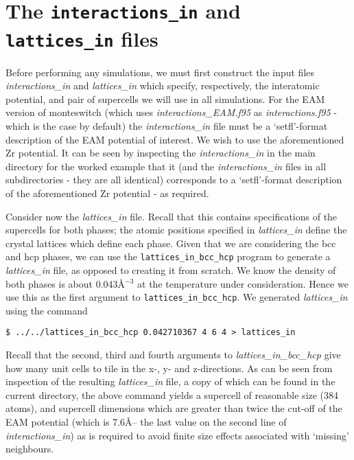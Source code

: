 \documentclass{report}
\begin{document}
\section{The \texttt{interactions\_in} and \texttt{lattices\_in} files}
Before performing any simulations, we must first construct the input files \emph{interactions\_in} and \emph{lattices\_in}
which specify, respectively, the interatomic potential, and pair of supercells we will use in all simulations. 
For the EAM version of monteswitch (which uses \emph{interactions\_EAM.f95} as \emph{interactions.f95} - which is the case by
default) the \emph{interactions\_in} file must be a `setfl'-format description of the EAM potential of interest.
We wish to use the aforementioned Zr potential. It can be seen by inspecting the \emph{interactions\_in} in the main
directory for the worked example that it (and the \emph{interactions\_in} files in all subdirectories - they 
are all identical) corresponds to a `setfl'-format description of the aforementioned Zr potential - as required.

Consider now the \emph{lattices\_in} file. Recall that this contains specifications of the supercells for both phases;
the atomic positions specified in \emph{lattices\_in} define the crystal lattices which define each phase.
Given that we are considering the bcc and hcp phases, we can use the \texttt{lattices\_in\_bcc\_hcp} program to generate
a \emph{lattices\_in} file, as opposed to creating it from scratch. We know the density of both phases is about
0.043\AA$^{-3}$ at the temperature under consideration. Hence we use this as the first argument to \texttt{lattices\_in\_bcc\_hcp}.
We generated  \emph{lattices\_in} using the command
\begin{verbatim}
$ ../../lattices_in_bcc_hcp 0.042710367 4 6 4 > lattices_in
\end{verbatim}
Recall that the second, third and fourth arguments to \emph{lattices\_in\_bcc\_hcp} give how many unit cells to tile in the
x-, y- and z-directions. As can be seen from inspection of the resulting \emph{lattices\_in} file, a copy of which can be found in
the current directory, the above command yields a supercell of reasonable size (384 atoms), and supercell
dimensions which are greater than twice the cut-off of the EAM potential (which is 7.6\AA -- the last value on the second
line of \emph{interactions\_in}) as is required to avoid finite size effects associated with `missing' neighbours.
\end{document}
